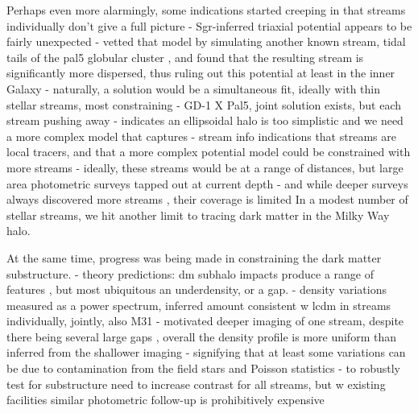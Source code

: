 \documentclass[final,5p,times,twocolumn,authoryear]{elsarticle}
\begin{document}
Perhaps even more alarmingly, some indications started creeping in that streams individually don't give a full picture
- Sgr-inferred triaxial potential appears to be fairly unexpected \citep{}
- \citet{pearson} vetted that model by simulating another known stream, tidal tails of the pal5 globular cluster \citep{odenkirchen, rockosi}, and found that the resulting stream is significantly more dispersed, thus ruling out this potential at least in the inner Galaxy
- naturally, a solution would be a simultaneous fit, ideally with thin stellar streams, most constraining \citep{lux}
- GD-1 X Pal5, joint solution exists, but each stream pushing away \citep{bovy}
- indicates an ellipsoidal halo is too simplistic and we need a more complex model that captures \citep{halo_shapes, lowing}
- stream info indications that streams are local tracers, and that a more complex potential model could be constrained with more streams \citep{bh:2018}
- ideally, these streams would be at a range of distances, but large area photometric surveys tapped out at current depth
- and while deeper surveys always discovered more streams \citep{pandas, des}, their coverage is limited
In a modest number of stellar streams, we hit another limit to tracing dark matter in the Milky Way halo.

At the same time, progress was being made in constraining the dark matter substructure.
- theory predictions: dm subhalo impacts produce a range of features \citep{johnston, ibata, carlberg, yoon}, but most ubiquitous an underdensity, or a gap.
- density variations measured as a power spectrum, inferred amount consistent w lcdm in streams individually, jointly, also M31 \citep{carlberg}
- motivated deeper imaging of one stream, despite there being several large gaps \citep{erkal:2017, bonaca:2020}, overall the density profile is more uniform than inferred from the shallower imaging
- signifying that at least some variations can be due to contamination from the field stars and Poisson statistics \citep{ibata}
- to robustly test for substructure need to increase contrast for all streams, but w existing facilities similar photometric follow-up is prohibitively expensive
\end{document}
